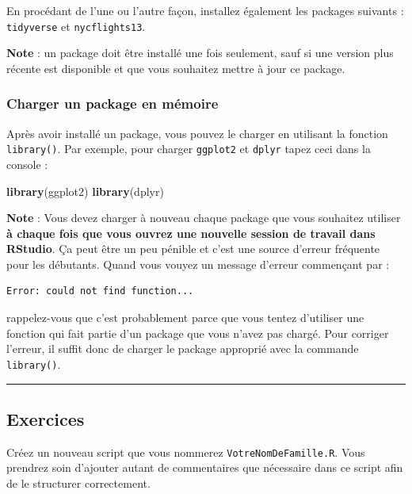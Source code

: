 \documentclass[a4paperpaper,]{article}
\newenvironment{Shaded}{\begin{snugshade}}{\end{snugshade}}
\newcommand{\KeywordTok}[1]{\textcolor[rgb]{0.12,0.11,0.11}{\textbf{#1}}}
\newcommand{\NormalTok}[1]{\textcolor[rgb]{0.12,0.11,0.11}{#1}}
\begin{document}
En procédant de l'une ou l'autre façon, installez également les packages suivants : \texttt{tidyverse} et \texttt{nycflights13}.

\textbf{Note} : un package doit être installé une fois seulement, sauf si une version plus récente est disponible et que vous souhaitez mettre à jour ce package.

\hypertarget{charger-un-package-en-memoire}{%
\subsubsection{Charger un package en mémoire}\label{charger-un-package-en-memoire}}

Après avoir installé un package, vous pouvez le charger en utilisant la fonction \texttt{library()}. Par exemple, pour charger \texttt{ggplot2} et \texttt{dplyr} tapez ceci dans la console :

\begin{Shaded}
\begin{Highlighting}[]
\KeywordTok{library}\NormalTok{(ggplot2)}
\KeywordTok{library}\NormalTok{(dplyr)}
\end{Highlighting}
\end{Shaded}

\textbf{Note} : Vous devez charger à nouveau chaque package que vous souhaitez utiliser \textbf{à chaque fois que vous ouvrez une nouvelle session de travail dans RStudio}. Ça peut être un peu pénible et c'est une source d'erreur fréquente pour les débutants. Quand vous vouyez un message d'erreur commençant par :

\begin{verbatim}
Error: could not find function...
\end{verbatim}

rappelez-vous que c'est probablement parce que vous tentez d'utiliser une fonction qui fait partie d'un package que vous n'avez pas chargé. Pour corriger l'erreur, il suffit donc de charger le package approprié avec la commande \texttt{library()}.

\begin{center}\rule{0.5\linewidth}{\linethickness}\end{center}

\hypertarget{exercices}{%
\subsection{Exercices}\label{exercices}}

Créez un nouveau script que vous nommerez \texttt{VotreNomDeFamille.R}. Vous prendrez soin d'ajouter autant de commentaires que nécessaire dans ce script afin de le structurer correctement.
\end{document}
